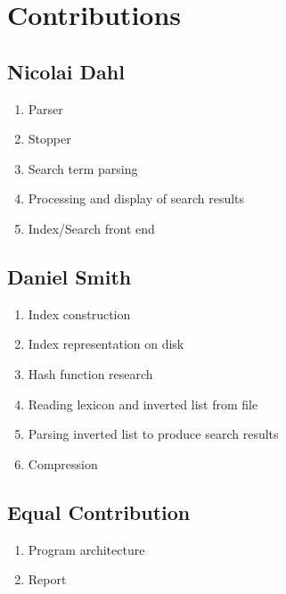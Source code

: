 \appendix
\label{sec:Appendix}

\section{Contributions}
\label{sec:contributions}

\subsection{Nicolai Dahl}
\begin{enumerate}
	\item Parser
	\item Stopper
	\item Search term parsing
	\item Processing and display of search results
	\item Index/Search front end
\end{enumerate}

\subsection{Daniel Smith}
\begin{enumerate}
	\item Index construction
	\item Index representation on disk
	\item Hash function research
	\item Reading lexicon and inverted list from file
	\item Parsing inverted list to produce search results
    \item Compression
\end{enumerate}

\subsection{Equal Contribution}
\begin{enumerate}
	\item Program architecture
	\item Report
\end{enumerate}
